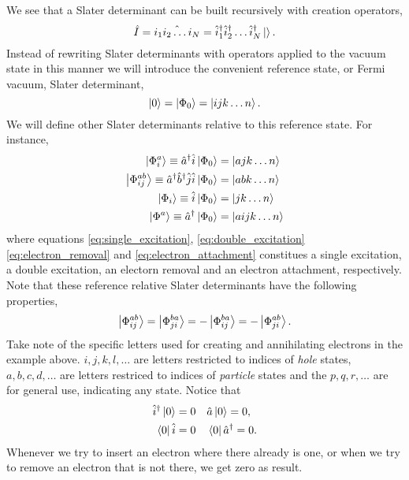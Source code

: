 		We see that a Slater determinant can be built recursively with creation operators,
		\begin{equation}
			\hat{I} = \hat{i_1i_2\dots i_N} 
				= \hat{i}_1^\dagger \hat{i}_2^\dagger \dots \hat{i}_N^\dagger\ket{}.
		\end{equation}
		Instead of rewriting Slater determinants with operators applied to the vacuum 
		state in this manner we will introduce the convenient reference state, or 
		Fermi vacuum, Slater determinant,
		\begin{equation}
			\ket{0} = \ket{\Phi_0} = \ket{ijk\dots n}. 
		\end{equation}
		We will define other Slater determinants relative to this reference state.
		For instance,
		\begin{align}
		\label{eq:single_excitation}
		\ket{\Phi^a_i} \equiv \hat{a}^\dagger \hat{i}\ket{\Phi_0} &= \ket{ajk\dots n} \\
		\label{eq:double_excitation}
		\ket{\Phi^{ab}_{ij}} \equiv \hat{a}^\dagger\hat{b}^\dagger \hat{j} \hat{i}\ket{\Phi_0}
			&= \ket{abk\dots n} \\
		\label{eq:electron_removal}
		\ket{\Phi_i} \equiv \hat{i}\ket{\Phi_0} &= \ket{jk\dots n} \\
		\label{eq:electron_attachment}
		\ket{\Phi^a} \equiv \hat{a}^\dagger \ket{\Phi_0} &= \ket{aijk\dots n}
		\end{align}
		where equations \ref{eq:single_excitation}, \ref{eq:double_excitation}
		\ref{eq:electron_removal} and \ref{eq:electron_attachment}
		constitues a single excitation, a double excitation, an electorn removal and an
		electron attachment, respectively. Note that these reference relative Slater 
		determinants have the following properties,
		\begin{equation}
			\ket{\Phi^{ab}_{ij}} = \ket{\Phi^{ba}_{ji}}
				= - \ket{\Phi^{ba}_{ij}} = - \ket{\Phi^{ab}_{ji}}.
		\end{equation}
		Take note of the specific letters used for creating and annihilating electrons 
		in the example above. $i,j,k,l,\dots$ are letters restricted to indices of 
		\emph{hole} states, $a,b,c,d,\dots$ are letters restriced to indices of
		\emph{particle} states and the $p,q,r,\dots$ are for general use, indicating 
		any state. Notice that
		\begin{equation}
			\begin{aligned}
				\hat{i}^\dagger\ket{0} = 0 &\quad \hat{a}\ket{0} = 0, \\
				\bra{0}\hat{i} = 0 &\quad \bra{0}\hat{a}^\dagger = 0.
			\end{aligned}	
		\end{equation}
		Whenever we try to insert an electron where there already is one, or when we 
		try to remove an electron that is not there, we get zero as result.



